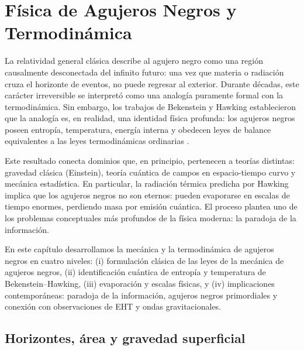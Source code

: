 
\chapter{Física de Agujeros Negros y Termodinámica}
\label{cap:termo_bh}

La relatividad general clásica describe al agujero negro como una región causalmente desconectada del infinito futuro: una vez que materia o radiación cruza el horizonte de eventos, no puede regresar al exterior. Durante décadas, este carácter irreversible se interpretó como una analogía puramente formal con la termodinámica. Sin embargo, los trabajos de Bekenstein y Hawking establecieron que la analogía es, en realidad, una identidad física profunda: los agujeros negros poseen entropía, temperatura, energía interna y obedecen leyes de balance equivalentes a las leyes termodinámicas ordinarias \cite{Bekenstein1973, Hawking1975, Wald1984, Carroll2004, Misner1973}.

Este resultado conecta dominios que, en principio, pertenecen a teorías distintas: gravedad clásica (Einstein), teoría cuántica de campos en espacio-tiempo curvo y mecánica estadística. En particular, la radiación térmica predicha por Hawking implica que los agujeros negros no son eternos: pueden evaporarse en escalas de tiempo enormes, perdiendo masa por emisión cuántica. El proceso plantea uno de los problemas conceptuales más profundos de la física moderna: la paradoja de la información.

En este capítulo desarrollamos la mecánica y la termodinámica de agujeros negros en cuatro niveles: (i) formulación clásica de las leyes de la mecánica de agujeros negros, (ii) identificación cuántica de entropía y temperatura de Bekenstein--Hawking, (iii) evaporación y escalas físicas, y (iv) implicaciones contemporáneas: paradoja de la información, agujeros negros primordiales y conexión con observaciones de EHT y ondas gravitacionales.

\section{Horizontes, área y gravedad superficial}
\label{sec:horizonte_area_gravsup}

